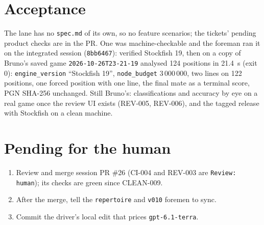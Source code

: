 \documentclass[11pt,a4paper]{article}
\begin{document}
\section*{Acceptance}

The lane has no \texttt{spec.md} of its own, so no feature scenarios; the tickets' pending product
checks are in the PR. One was machine-checkable and the foreman ran it on the integrated session
(\texttt{8bb6467}):  verified Stockfish 19, then
 on a copy of Bruno's saved game \texttt{2026-10-26T23-21-19} analysed
124 positions in 21.4~s (exit 0): \texttt{engine\_version} ``Stockfish 19'',
\texttt{node\_budget} 3\,000\,000, two lines on 122 positions, one forced position with one line,
the final mate as a terminal score, PGN SHA-256 unchanged. Still Bruno's: classifications and
accuracy by eye on a real game once the review UI exists (REV-005, REV-006), and the tagged release
with Stockfish on a clean machine.

\section*{Pending for the human}

\begin{enumerate}
  \item Review and merge session PR \#26 (CI-004 and REV-003 are \texttt{Review: human}); its
        checks are green since CLEAN-009.
  \item After the merge, tell the \texttt{repertoire} and \texttt{v010} foremen to sync.
  \item Commit the driver's local edit that prices \texttt{gpt-6.1-terra}.
\end{enumerate}
\end{document}
